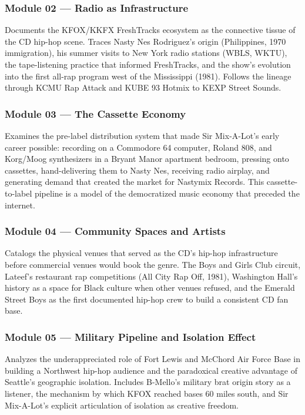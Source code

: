 \documentclass[11pt,letterpaper]{article}
\begin{document}
\subsubsection{Module 02 --- Radio as Infrastructure}
Documents the KFOX/KKFX FreshTracks ecosystem as the connective tissue of the CD hip-hop scene. Traces Nasty Nes Rodriguez's origin (Philippines, 1970 immigration), his summer visits to New York radio stations (WBLS, WKTU), the tape-listening practice that informed FreshTracks, and the show's evolution into the first all-rap program west of the Mississippi (1981). Follows the lineage through KCMU Rap Attack and KUBE 93 Hotmix to KEXP Street Sounds.

\subsubsection{Module 03 --- The Cassette Economy}
Examines the pre-label distribution system that made Sir Mix-A-Lot's early career possible: recording on a Commodore 64 computer, Roland 808, and Korg/Moog synthesizers in a Bryant Manor apartment bedroom, pressing onto cassettes, hand-delivering them to Nasty Nes, receiving radio airplay, and generating demand that created the market for Nastymix Records. This cassette-to-label pipeline is a model of the democratized music economy that preceded the internet.

\subsubsection{Module 04 --- Community Spaces and Artists}
Catalogs the physical venues that served as the CD's hip-hop infrastructure before commercial venues would book the genre. The Boys and Girls Club circuit, Lateef's restaurant rap competitions (All City Rap Off, 1981), Washington Hall's history as a space for Black culture when other venues refused, and the Emerald Street Boys as the first documented hip-hop crew to build a consistent CD fan base.

\subsubsection{Module 05 --- Military Pipeline and Isolation Effect}
Analyzes the underappreciated role of Fort Lewis and McChord Air Force Base in building a Northwest hip-hop audience and the paradoxical creative advantage of Seattle's geographic isolation. Includes B-Mello's military brat origin story as a listener, the mechanism by which KFOX reached bases 60 miles south, and Sir Mix-A-Lot's explicit articulation of isolation as creative freedom.
\end{document}
